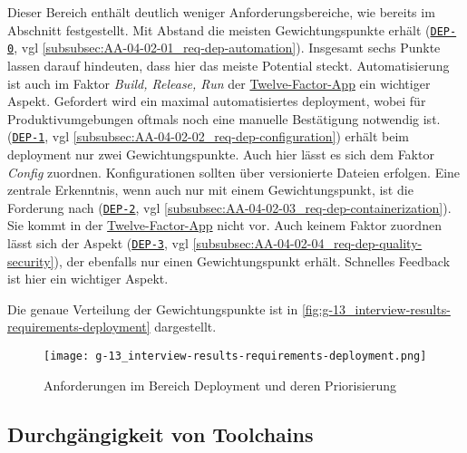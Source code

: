 Dieser Bereich enthält deutlich weniger Anforderungsbereiche, wie bereits im Abschnitt  festgestellt. Mit Abstand die meisten Gewichtungspunkte erhält \textbf{} (\hyperref[subsubsec:AA-04-02-01_req-dep-automation]{\texttt{DEP-0}}, \acrshort{vgl} \autoref{subsubsec:AA-04-02-01_req-dep-automation}). Insgesamt sechs Punkte lassen darauf hindeuten, dass hier das meiste Potential steckt. Automatisierung ist auch im Faktor \textit{Build, Release, Run} der \hyperref[sec:03-05_concept-of-twelve-factor-app]{Twelve-Factor-App} ein wichtiger Aspekt. Gefordert wird ein maximal automatisiertes \Gls{deployment}, wobei für Produktivumgebungen oftmals noch eine manuelle Bestätigung notwendig ist. \textbf{} (\hyperref[subsubsec:AA-04-02-02_req-dep-configuration]{\texttt{DEP-1}}, \acrshort{vgl} \autoref{subsubsec:AA-04-02-02_req-dep-configuration}) erhält beim \Gls{deployment} nur zwei Gewichtungspunkte. Auch hier lässt es sich dem Faktor \textit{Config} zuordnen. Konfigurationen sollten über versionierte Dateien erfolgen. Eine zentrale Erkenntnis, wenn auch nur mit einem Gewichtungspunkt, ist die Forderung nach \textbf{} (\hyperref[subsubsec:AA-04-02-03_req-dep-containerization]{\texttt{DEP-2}}, \acrshort{vgl} \autoref{subsubsec:AA-04-02-03_req-dep-containerization}). Sie kommt in der \hyperref[sec:03-05_concept-of-twelve-factor-app]{Twelve-Factor-App} nicht vor. Auch keinem Faktor zuordnen lässt sich der Aspekt \textbf{} (\hyperref[subsubsec:AA-04-02-04_req-dep-quality-security]{\texttt{DEP-3}}, \acrshort{vgl} \autoref{subsubsec:AA-04-02-04_req-dep-quality-security}), der ebenfalls nur einen Gewichtungspunkt erhält. Schnelles Feedback ist hier ein wichtiger Aspekt.

Die genaue Verteilung der Gewichtungspunkte ist in \autoref{fig:g-13_interview-results-requirements-deployment} dargestellt.

\begin{figure}[h]
    \centering
    \texttt{[image: g-13\_interview-results-requirements-deployment.png]}
    \caption{Anforderungen im Bereich Deployment und deren Priorisierung}
    \label{fig:g-13_interview-results-requirements-deployment}
\end{figure}

\subsection{Durchgängigkeit von Toolchains}
\label{subsec:04-02-04_consistency-of-toolchains}

